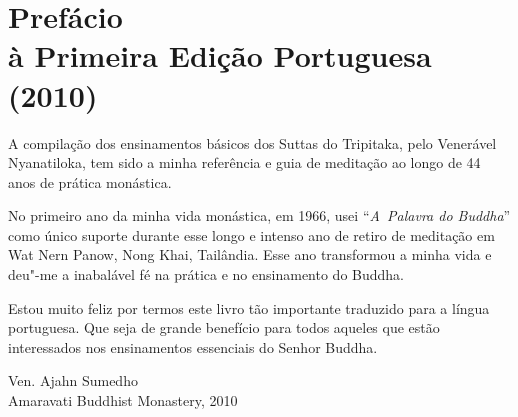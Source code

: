\chapter[Prefácio à Primeira Edição Portuguesa (2010)]{Prefácio\\ à Primeira Edição Portuguesa\\ (2010)}

A compilação dos ensinamentos básicos dos Suttas do Tripitaka, pelo Venerável
Nyanatiloka, tem sido a minha referência e guia de meditação ao longo de 44 anos
de prática monástica.

No primeiro ano da minha vida monástica, em 1966, usei “\emph{A~\mbox{Palavra} do
  Buddha}” como único suporte durante esse longo e intenso ano de retiro de
meditação em Wat Nern Panow, Nong Khai, Tailândia. Esse ano transformou a minha
vida e deu"-me a inabalável fé na prática e no ensinamento do Buddha.

Estou muito feliz por termos este livro tão importante traduzido para a língua
portuguesa. Que seja de grande benefício para todos aqueles que estão
interessados nos ensinamentos essenciais do Senhor Buddha.

\bigskip

{\raggedleft
  Ven. Ajahn Sumedho\\
  Amaravati Buddhist Monastery, 2010
\par}
